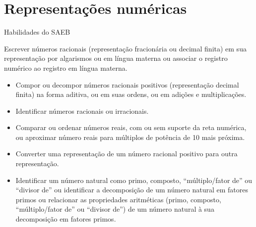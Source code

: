 
\section{Representações numéricas}

Habilidades do SAEB 

Escrever números racionais (representação
fracionária ou decimal finita) em sua representação por algarismos ou em
língua materna ou associar o registro numérico ao registro em língua
materna.

\begin{itemize}
\item
  Compor ou decompor números racionais positivos (representação decimal
  finita) na forma aditiva, ou em suas ordens, ou em adições e
  multiplicações.
\item
  Identificar números racionais ou irracionais.
\item
  Comparar ou ordenar números reais, com ou sem suporte da reta
  numérica, ou aproximar número reais para múltiplos de potência de 10
  mais próxima.
\item
  Converter uma representação de um número racional positivo para outra
  representação.
\item
  Identificar um número natural como primo, composto, ``múltiplo/fator
  de'' ou ``divisor de'' ou identificar a decomposição de um número
  natural em fatores primos ou relacionar as propriedades aritméticas
  (primo, composto, ``múltiplo/fator de'' ou ``divisor de'') de um
  número natural à sua decomposição em fatores primos.
\end{itemize}


